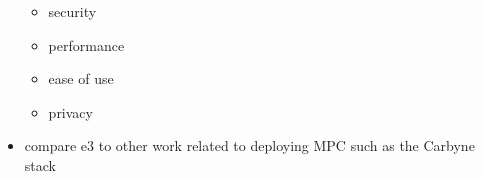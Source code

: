 \begin{itemize}
  \begin{itemize}
  \tightlist
  \item
    security
  \item
    performance
  \item
    ease of use
  \item
    privacy
  \end{itemize}
\item
  compare \gls{e3} to other work related to deploying MPC such as the
  Carbyne stack\autocite{robertboschgmbhCarbyneStack2022}
\end{itemize}
